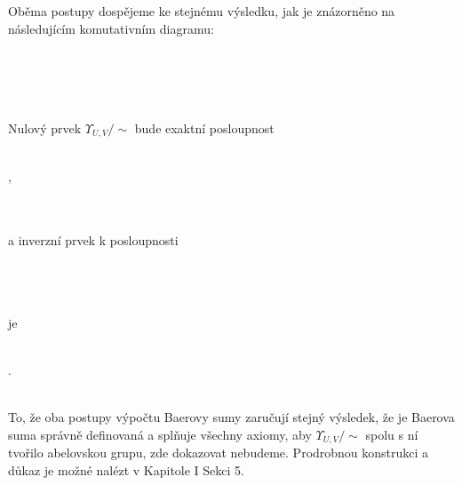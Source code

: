 \begin{dfn}
           Oběma postupy dospějeme ke stejnému výsledku, jak je znázorněno na 
           následujícím komutativním diagramu:
           \\\\
           \centerline{} \\\\\\
         Nulový prvek $\Upsilon_{U,V}/\sim$ bude exaktní posloupnost \\\\
           \centerline{,} \\\\
         a inverzní prvek k posloupnosti \\\\
           \centerline{} \\\\ je \\\\
           \centerline{.} \\
                    
         To, že oba postupy výpočtu Baerovy sumy zaručují stejný výsledek, 
         že je Baerova suma 
         správně definovaná a splňuje všechny axiomy, aby
         $\Upsilon_{U,V}/\sim$ spolu s ní tvořilo abelovskou grupu, zde 
         dokazovat nebudeme. Prodrobnou konstrukci a důkaz je možné nalézt v 
         \cite{2} Kapitole I Sekci 5.
     \end{dfn}
          
